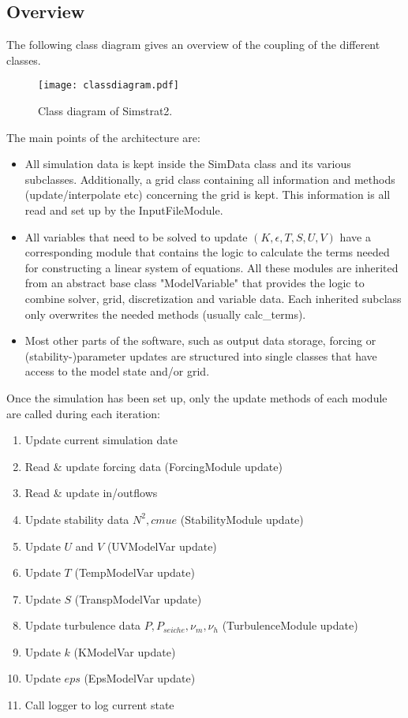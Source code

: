 \documentclass[paper=a4, fontsize=12pt]{article}
\begin{document}
\subsection{Overview}
The following class diagram gives an overview of the coupling of the different classes.
\begin{figure}[h]
		\texttt{[image: classdiagram.pdf]}
		\caption{Class diagram of Simstrat2.}
\end{figure}
The main points of the architecture are:
\begin{itemize}
	\item All simulation data is kept inside the SimData class and its various subclasses. Additionally, a grid class containing all information and methods (update/interpolate etc) concerning the grid is kept. This information is all read and set up by the InputFileModule.
	
	\item All variables that need to be solved to update $(K,\epsilon,T,S,U,V)$ have a corresponding module that contains the logic to calculate the terms needed for constructing a linear system of equations. All these modules are inherited from an abstract base class "ModelVariable" that provides the logic to combine solver, grid, discretization and variable data. Each inherited subclass only overwrites the needed methods (usually calc\_terms).
	
	\item Most other parts of the software, such as output data storage, forcing or (stability-)parameter updates are structured into single classes that have access to the model state and/or grid.
\end{itemize}

Once the simulation has been set up, only the update methods of each module are called during each iteration:
\begin{enumerate}
	\item Update current simulation date
	\item Read \& update forcing data (ForcingModule update)
	\item Read \& update in/outflows
	\item Update stability data $N^{2},cmue$ (StabilityModule update)
	\item Update $U$ and $V$ (UVModelVar update)
	\item Update $T$ (TempModelVar update)
	\item Update $S$ (TranspModelVar update)
	\item Update turbulence data $P,P_{seiche},\nu_{m},\nu_{h}$ (TurbulenceModule update)
	\item Update $k$ (KModelVar update)
	\item Update $eps$ (EpsModelVar update)
	\item Call logger to log current state
\end{enumerate}
\end{document}

